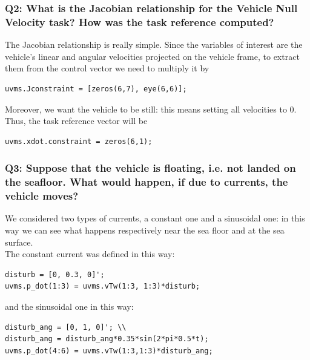 \documentclass{article}
\begin{document}
\subsubsection{Q2: What is the Jacobian relationship for the Vehicle Null Velocity task? How was the task reference computed?}
The Jacobian relationship is really simple. Since the variables of interest are the vehicle's linear and angular velocities projected on the vehicle frame, to extract them from the control vector we need to multiply it by
\begin{lstlisting}
uvms.Jconstraint = [zeros(6,7), eye(6,6)];
\end{lstlisting}
Moreover, we want the vehicle to be still: this means setting all velocities to 0. Thus, the task reference vector will be
\begin{lstlisting}
uvms.xdot.constraint = zeros(6,1);
\end{lstlisting}


\subsubsection{Q3: Suppose that the vehicle is floating, i.e. not landed on the seafloor. What would happen, if due to currents, the vehicle moves?}
We considered two types of currents, a constant one and a sinusoidal one: in this way we can see what happens respectively near the sea floor and at the sea surface.\\
The constant current was defined in this way:
\begin{lstlisting}
disturb = [0, 0.3, 0]';
uvms.p_dot(1:3) = uvms.vTw(1:3, 1:3)*disturb;
\end{lstlisting}
and the sinusoidal one in this way:
\begin{lstlisting}
disturb_ang = [0, 1, 0]'; \\
disturb_ang = disturb_ang*0.35*sin(2*pi*0.5*t);
uvms.p_dot(4:6) = uvms.vTw(1:3,1:3)*disturb_ang;
\end{lstlisting}
\end{document}
